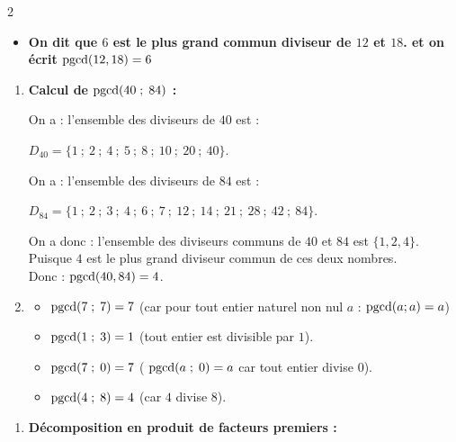 \documentclass[10pt, a4paper]{article}
\begin{document}
\begin{multicols*}{2}
\begin{Solution}[ACTIVITÉ][5]
\begin{enumerate}[leftmargin=*,itemsep=0.5pt]
    \begin{itemize}[label=$\blacktriangleright$, leftmargin=*, nosep]
    \item \textbf{On dit que $6$ est le \textcolor{PrimaryColor}{plus grand commun diviseur}  de $12$ et $18$. et on écrit $\operatorname{pgcd}(12, 18) = 6$}
    \end{itemize}

\end{enumerate}
\end{Solution}

\begin{Solution}[APPLICATION][11]
\begin{enumerate}[leftmargin=*,itemsep=0.5pt]
    \item \textbf{Calcul de $\operatorname{pgcd}(40 \; ; \; 84)$ :}

    On a : l'ensemble des diviseurs de $40$ est :

    $D_{40} = \big\{1~;~2~;~4~;~5~;~8~;~10~;~20~;~40\big\}$.

    On a : l'ensemble des diviseurs de $84$ est :

    $D_{84} = \big\{1~;~2~;~3~;~4~;~6~;~7~;~12~;~14~;~21~;~28~;~42~;~84\big\}$.

    On a donc : l'ensemble des diviseurs communs de $40$ et $84$ est $\big\{1, 2, 4\big\}$. \\
    Puisque $4$ est le plus grand diviseur commun de ces deux nombres. \\
    Donc : \quad $\operatorname{pgcd}(40, 84) = 4$.

    \item
    \begin{itemize}[leftmargin=*,itemsep=0.5pt]
        \item $\operatorname{pgcd}(7 \; ; \; 7) = 7$ \quad
        (car pour tout entier naturel non nul $a$ : $\operatorname{pgcd}(a ; a) = a$)
        \item $\operatorname{pgcd}(1 \; ; \; 3) = 1$ \quad (tout entier est divisible par $1$).
        \item $\operatorname{pgcd}(7 \; ; \; 0) = 7$ \quad ( $\operatorname{pgcd}(a \; ; \; 0) = a$ car tout entier divise $0$).
        \item $\operatorname{pgcd}(4 \; ; \; 8) = 4$ \quad (car $4$ divise $8$).
    \end{itemize}
\end{enumerate}
\end{Solution}

\begin{Solution}[APPLICATION][12]
\begin{enumerate}[leftmargin=*,itemsep=0.5pt]
    \item \textbf{Décomposition en produit de facteurs premiers :}


\end{enumerate}
\end{Solution}
\end{multicols*}
\end{document}
